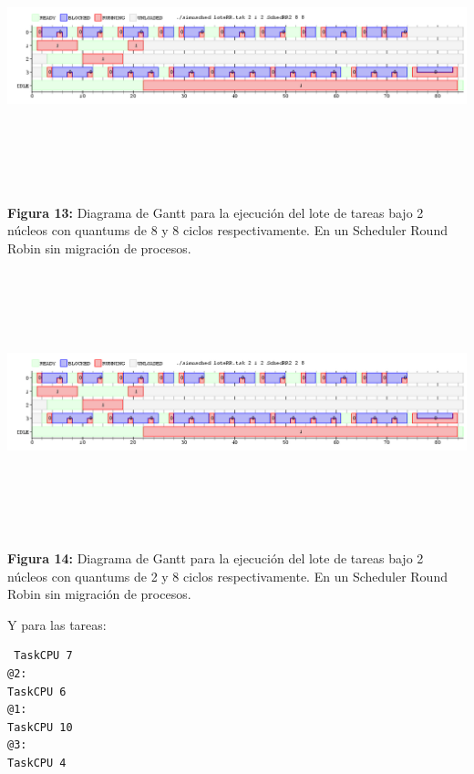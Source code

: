 \documentclass[a4paper]{article}
\begin{document}
  
  \includegraphics[width=\textwidth,height=3.0in,keepaspectratio
]{imagenes/ej8/2eje2.png} \newline
\begin {flushleft}
\textbf{Figura 13:} Diagrama de Gantt para la ejecuci\'on del lote de tareas bajo 2 n\'ucleos con quantums de 8 y 8 ciclos respectivamente. En un Scheduler Round Robin sin migración de procesos.
\end{flushleft}	

\includegraphics[width=\textwidth,height=3.0in,keepaspectratio
]{imagenes/ej8/2eje3.png} \newline
\begin {flushleft}
\textbf{Figura 14:} Diagrama de Gantt para la ejecuci\'on del lote de tareas bajo 2 n\'ucleos con quantums de 2 y 8 ciclos respectivamente. En un Scheduler Round Robin sin migración de procesos.
\end{flushleft}	

\bigskip
Y para las tareas: 
  
 \begin{codesnippet}
	\begin{verbatim}
 TaskCPU 7
@2:
TaskCPU 6
@1:
TaskCPU 10
@3:
TaskCPU 4
	\end{verbatim}
	\end{codesnippet}
	
\end{document}
